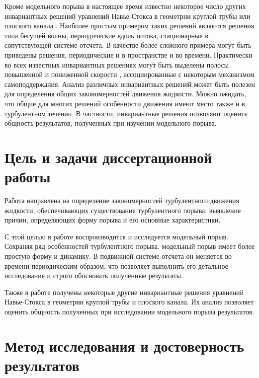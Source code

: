 Кроме модельного порыва в настоящее время известно некоторое число других инвариантных решений уравнений Навье-Стокса в геометрии круглой трубы или плоского канала \cite{Kawahara2012}. Наиболее простым примером таких решений являются решения типа бегущей волны, периодические вдоль потока, стационарные в сопутствующей системе отсчета. В качестве более сложного примера могут быть приведены решения, периодические и в пространстве и во времени. Практически во всех известных инвариантных решениях могут быть выделены полосы повышенной и пониженной скорости  \cite{Kawahara2012}, ассоциированные с некоторым механизмом самоподдержания. Анализ различных инвариантных решений может быть полезен для определения общих закономерностей движения жидкости. Можно ожидать, что общие для многих решений особенности движения имеют место также и в турбулентном течении. В частности, инвариантные решения позволяют оценить общность результатов, полученных при изучении модельного порыва. 


\section{Цель и задачи диссертационной работы}

Работа направлена на определение закономерностей турбулентного движения жидкости, обеспечивающих существование турбулентного порыва; выявление причин, определяющих форму порыва и его основные характеристики. 

С этой целью в работе воспроизводится и исследуется модельный порыв. Сохраняя ряд особенностей турбулентного порыва, модельный порыв имеет более простую форму и динамику. В подвижной системе отсчета он меняется во времени периодическим образом, что позволяет выполнить его детальное исследование и строго обосновать полученные результаты. 

Также в работе получены некоторые другие инвариантные решения уравнений Навье-Стокса в геометрии круглой трубы и плоского канала. Их анализ позволяет оценить общность полученных при исследовании модельного порыва результатов. 


\section{Метод исследования и достоверность результатов}


